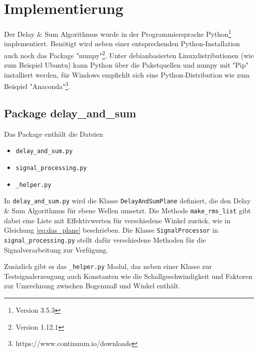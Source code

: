 \section{Implementierung}
	
	Der Delay \& Sum Algorithmus wurde in der Programmiersprache Python\footnote{Version 3.5.3} implementiert. Benötigt wird neben einer entsprechenden Python-Installation auch noch das Package "numpy"\footnote{Version 1.12.1}. Unter debianbasierten Linuxdistributionen (wie zum Beispiel Ubuntu) kann Python über die Paketquellen und numpy mit "Pip" installiert werden, für Windows empfiehlt sich eine Python-Distribution wie zum Beispiel "Anaconda"\footnote{https://www.continuum.io/downloads}.
	
	\subsection{Package delay\_and\_sum}
	
	Das Package enthält die Dateien
	\begin{itemize}
		\item \texttt{delay\_and\_sum.py}
		\item \texttt{signal\_processing.py}
		\item \texttt{\_helper.py}
	\end{itemize}
	In \texttt{delay\_and\_sum.py} wird die Klasse \texttt{DelayAndSumPlane} definiert, die den Delay \& Sum Algorithmus für ebene Wellen umsetzt. Die Methode \texttt{make\_rms\_list} gibt dabei eine Liste mit Effektivwerten für verschiedene Winkel zurück, wie in Gleichung \ref{eq:das_plane} beschrieben.
	Die Klasse \texttt{SignalProcessor} in \texttt{signal\_processing.py} stellt dafür verschiedene Methoden für die Signalverarbeitung zur Verfügung.
	
	Zusäzlich gibt es das \texttt{\_helper.py} Modul, das neben einer Klasse zur Testsignalerzeugung auch Konstanten wie die Schallgeschwindigkeit und Faktoren zur Umrechnung zwischen Bogenmaß und Winkel enthält.